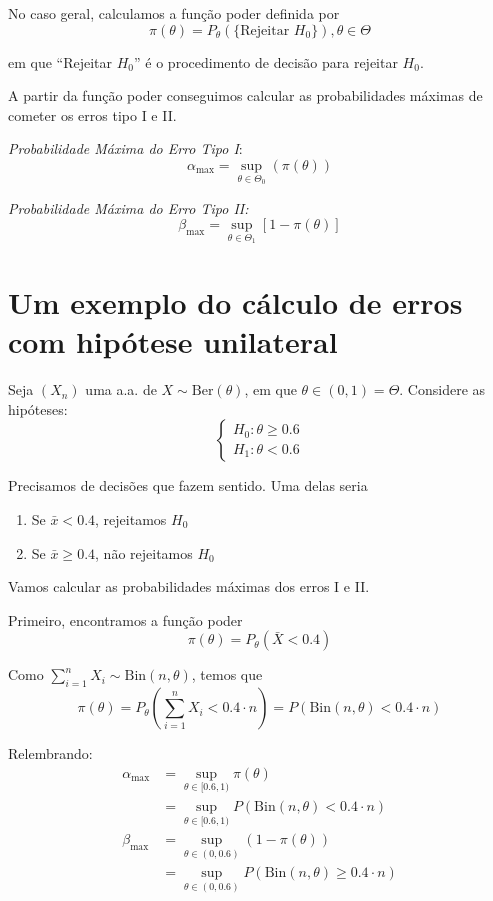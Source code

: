 \documentclass[
  letterpaper,
  DIV=11,
  numbers=noendperiod]{scrreprt}
\providecommand{\tightlist}{%
  \setlength{\itemsep}{0pt}\setlength{\parskip}{0pt}}\usepackage{longtable,booktabs,array}
\begin{document}
No caso geral, calculamos a função poder definida por \[
\pi (\theta) = P_{\theta}(\{ \text{Rejeitar } H_{0} \}), \theta \in \Theta
\]

em que ``Rejeitar \(H_0\)'' é o procedimento de decisão para rejeitar
\(H_0\).

A partir da função poder conseguimos calcular as probabilidades máximas
de cometer os erros tipo I e II.

\emph{Probabilidade Máxima do Erro Tipo I}: \[
\alpha_{\max} = \sup_{\theta \in \Theta_{0}}(\pi(\theta))
\]

\emph{Probabilidade Máxima do Erro Tipo II:} \[
\beta_{\max} = \sup_{\theta \in \Theta_{1}}[1-\pi(\theta)]
\]

\section{Um exemplo do cálculo de erros com hipótese
unilateral}\label{um-exemplo-do-cuxe1lculo-de-erros-com-hipuxf3tese-unilateral}

Seja \((X_{n})\) uma a.a. de \(X\sim\mathrm{Ber}(\theta)\), em que
\(\theta \in (0,1) = \Theta\). Considere as hipóteses: \[
\begin{cases}
H_{0}: \theta \geq 0.6\\
H_{1}: \theta < 0.6
\end{cases}
\]

Precisamos de decisões que fazem sentido. Uma delas seria

\begin{enumerate}
\def\labelenumi{\arabic{enumi}.}
\tightlist
\item
  Se \(\bar{x}<0.4\), rejeitamos \(H_{0}\)
\item
  Se \(\bar{x} \geq 0.4\), não rejeitamos \(H_{0}\)
\end{enumerate}

Vamos calcular as probabilidades máximas dos erros I e II.

Primeiro, encontramos a função poder \[
\pi(\theta) = P_{\theta}(\bar{X}<0.4)
\]

Como \(\sum^n_{i=1}X_{i} \sim \mathrm{Bin}(n,\theta)\), temos que \[
\pi(\theta) = P_{\theta} \left( \sum^n_{i=1}X_{i} < 0.4 \cdot n \right) = P(\mathrm{Bin}(n,\theta) < 0.4 \cdot n)
\]

Relembrando: \[
\begin{aligned}
\alpha_{\max} &= \sup_{\theta \in [0.6,1)} \pi(\theta) \\
&= \sup_{\theta \in [0.6,1)} P(\mathrm{Bin}(n, \theta) < 0.4 \cdot n) \\
\beta_{\max} &= \sup_{\theta \in (0,0.6)} (1-\pi(\theta)) \\
&= \sup_{\theta \in (0,0.6)}P(\mathrm{Bin}(n,\theta)\geq 0.4 \cdot n)
\end{aligned}
\]
\end{document}
